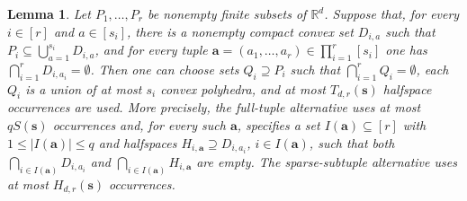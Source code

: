 \documentclass[11pt]{article}
\newtheorem{lemma}[theorem]{Lemma}
\theoremstyle{definition}
\newcommand*{\abs}[1]{\lvert#1\rvert}
\newcommand{\R}{\mathbb{R}}
\begin{document}
\begin{lemma}\label{lem:polyhedral-reduction}
Let \(P_{1},\ldots,P_{r}\) be nonempty finite subsets of \(\R^{d}\). Suppose that, for every \(i\in [r]\) and \(a\in [s_{i}]\), there is a nonempty compact convex set \(D_{i,a}\) such that \(P_{i}\subseteq\bigcup_{a=1}^{s_{i}}D_{i,a}\), and for every tuple \(\boldsymbol{a}=(a_{1},\ldots,a_{r})\in\prod_{i=1}^{r}[s_{i}]\) one has \(\bigcap_{i=1}^{r}D_{i,a_{i}}=\emptyset\). Then one can choose sets \(Q_{i}\supseteq P_{i}\) such that \(\bigcap_{i=1}^{r}Q_{i}=\emptyset\), each \(Q_{i}\) is a union of at most \(s_{i}\) convex polyhedra, and at most \(T_{d,r}(\boldsymbol{s})\) halfspace occurrences are used. More precisely, the full-tuple alternative uses at most \(qS(\boldsymbol{s})\) occurrences and, for every such \(\boldsymbol{a}\), specifies a set \(I(\boldsymbol{a})\subseteq[r]\) with \(1\le\abs{I(\boldsymbol{a})}\le q\) and halfspaces \(H_{i,\boldsymbol{a}}\supseteq D_{i,a_{i}}\), \(i\in I(\boldsymbol{a})\), such that both \(\bigcap_{i\in I(\boldsymbol{a})}D_{i,a_{i}}\) and \(\bigcap_{i\in I(\boldsymbol{a})}H_{i,\boldsymbol{a}}\) are empty. The sparse-subtuple alternative uses at most \(H_{d,r}(\boldsymbol{s})\) occurrences.
\end{lemma}
\end{document}
